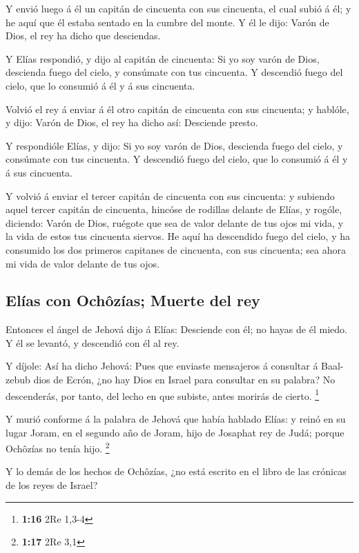  Y envió luego á él un capitán de cincuenta con sus
cincuenta, el cual subió á él; y he aquí que él estaba sentado en la
cumbre del monte. Y él le dijo: Varón de Dios, el rey ha dicho que
desciendas.

 Y Elías respondió, y dijo al capitán de cincuenta: Si yo
soy varón de Dios, descienda fuego del cielo, y consúmate con tus
cincuenta. Y descendió fuego del cielo, que lo consumió á él y á sus
cincuenta.

 Volvió el rey á enviar á él otro capitán de cincuenta con
sus cincuenta; y hablóle, y dijo: Varón de Dios, el rey ha dicho así:
Desciende presto.

 Y respondióle Elías, y dijo: Si yo soy varón de Dios,
descienda fuego del cielo, y consúmate con tus cincuenta. Y descendió
fuego del cielo, que lo consumió á él y á sus cincuenta.

 Y volvió á enviar el tercer capitán de cincuenta con sus
cincuenta: y subiendo aquel tercer capitán de cincuenta, hincóse de
rodillas delante de Elías, y rogóle, diciendo: Varón de Dios, ruégote
que sea de valor delante de tus ojos mi vida, y la vida de estos tus
cincuenta siervos.  He aquí ha descendido fuego del cielo,
y ha consumido los dos primeros capitanes de cincuenta, con sus
cincuenta; sea ahora mi vida de valor delante de tus ojos.

\hypertarget{eluxedas-con-ochuxf4zuxedas-muerte-del-rey}{%
\subsection{Elías con Ochôzías; Muerte del
rey}\label{eluxedas-con-ochuxf4zuxedas-muerte-del-rey}}

 Entonces el ángel de Jehová dijo á Elías: Desciende con
él; no hayas de él miedo. Y él se levantó, y descendió con él al rey.

 Y díjole: Así ha dicho Jehová: Pues que enviaste
mensajeros á consultar á Baal-zebub dios de Ecrón, ¿no hay Dios en
Israel para consultar en su palabra? No descenderás, por tanto, del
lecho en que subiste, antes morirás de cierto. \footnote{\textbf{1:16}
  2Re 1,3-4}

 Y murió conforme á la palabra de Jehová que había hablado
Elías: y reinó en su lugar Joram, en el segundo año de Joram, hijo de
Josaphat rey de Judá; porque Ochôzías no tenía hijo. \footnote{\textbf{1:17}
  2Re 3,1}

 Y lo demás de los hechos de Ochôzías, ¿no está escrito en
el libro de las crónicas de los reyes de Israel?

